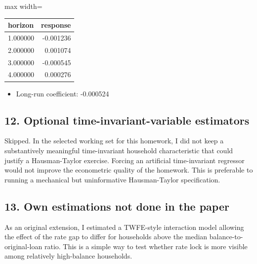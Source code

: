 \documentclass[a4paper,11pt]{article}
\renewcommand{\_}{\textunderscore\allowbreak}
\renewcommand{\arraystretch}{1.25}
\providecommand{\tightlist}{%
  \setlength{\itemsep}{0pt}\setlength{\parskip}{0pt}}
\begin{document}
\begin{center}
\begingroup
\footnotesize
\setlength{\tabcolsep}{4pt}
\renewcommand{\arraystretch}{1.22}
\begin{adjustbox}{max width=\textwidth}
\begin{tabular}{@{}lr@{}}
\toprule
horizon & response \\
\midrule
1.000000 & -0.001236 \\
2.000000 & 0.001074 \\
3.000000 & -0.000545 \\
4.000000 & 0.000276 \\
\bottomrule
\end{tabular}
\end{adjustbox}
\endgroup
\end{center}

\begin{itemize}
\tightlist
\item
  Long-run coefficient: -0.000524
\end{itemize}

\hypertarget{optional-time-invariant-variable-estimators}{%
\subsection{12. Optional time-invariant-variable
estimators}\label{optional-time-invariant-variable-estimators}}

Skipped. In the selected working set for this homework, I did not keep a
substantively meaningful time-invariant household characteristic that
could justify a Hausman-Taylor exercise. Forcing an artificial
time-invariant regressor would not improve the econometric quality of
the homework. This is preferable to running a mechanical but
uninformative Hausman-Taylor specification.

\hypertarget{own-estimations-not-done-in-the-paper}{%
\subsection{13. Own estimations not done in the
paper}\label{own-estimations-not-done-in-the-paper}}

As an original extension, I estimated a TWFE-style interaction model
allowing the effect of the rate gap to differ for households above the
median balance-to-original-loan ratio. This is a simple way to test
whether rate lock is more visible among relatively high-balance
households.
\end{document}
